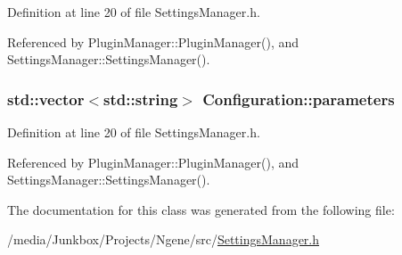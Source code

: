Definition at line 20 of file SettingsManager.h.

Referenced by PluginManager::PluginManager(), and SettingsManager::SettingsManager().\hypertarget{classConfiguration_9d329802f7cd5bc48e278f34168594a7}{
\subsubsection{\setlength{\rightskip}{0pt plus 5cm}std::vector$<$std::string$>$ {\bf Configuration::parameters}}}
\label{classConfiguration_9d329802f7cd5bc48e278f34168594a7}




Definition at line 20 of file SettingsManager.h.

Referenced by PluginManager::PluginManager(), and SettingsManager::SettingsManager().

The documentation for this class was generated from the following file:\begin{CompactItemize}
\item 
/media/Junkbox/Projects/Ngene/src/\hyperlink{SettingsManager_8h}{SettingsManager.h}\end{CompactItemize}
